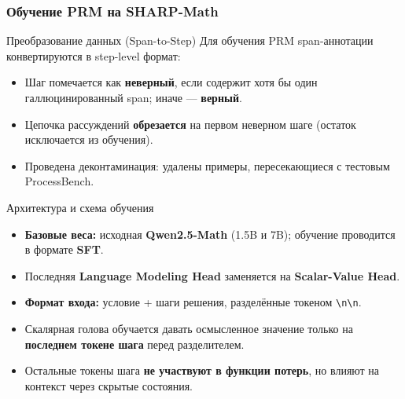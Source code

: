 \documentclass{beamer}
\begin{document}
\begin{frame}
  \frametitle{Обучение PRM на SHARP-Math}
  \tiny

  \begin{block}{Преобразование данных (Span-to-Step)}
      Для обучения PRM span-аннотации конвертируются в step-level формат:
      \begin{itemize}
          \item Шаг помечается как \textbf{неверный}, если содержит хотя бы один галлюцинированный span; иначе — \textbf{верный}.
          \item Цепочка рассуждений \textbf{обрезается} на первом неверном шаге (остаток исключается из обучения).
          \item Проведена деконтаминация: удалены примеры, пересекающиеся с тестовым ProcessBench.
      \end{itemize}
  \end{block}

  \begin{block}{Архитектура и схема обучения}
      \begin{itemize}
          \item \textbf{Базовые веса:} исходная \textbf{Qwen2.5-Math} (1.5B и 7B); обучение проводится в формате \textbf{SFT}.
          \item Последняя \textbf{Language Modeling Head} заменяется на \textbf{Scalar-Value Head}.
          \item \textbf{Формат входа:} условие + шаги решения, разделённые токеном \texttt{\textbackslash n\textbackslash n}.
          \item Скалярная голова обучается давать осмысленное значение только на \textbf{последнем токене шага} перед разделителем.
          \item Остальные токены шага \textbf{не участвуют в функции потерь}, но влияют на контекст через скрытые состояния.
      \end{itemize}
  \end{block}
\end{frame}
\end{document}
